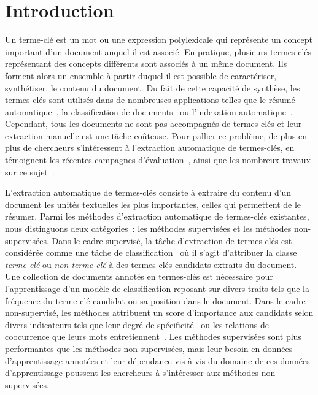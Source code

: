 \section{Introduction}
\label{sec:introduction}
  Un terme-clé est un mot ou une expression polylexicale qui représente un
  concept important d'un document auquel il est associé. En pratique, plusieurs
  termes-clés représentant des concepts différents sont associés à un même
  document. Ils forment alors un ensemble à partir duquel il est possible de
  caractériser, synthétiser, le contenu du document. Du fait de cette capacité
  de synthèse, les termes-clés sont utilisés dans de nombreuses applications
  telles que le résumé automatique~\cite{avanzo2005keyphrase}, la classification
  de documents~\cite{han2007webdocumentclustering} ou l'indexation
  automatique~\cite{medelyan2008smalltrainingset}. Cependant, tous les documents
  ne sont pas accompagnés de termes-clés et leur extraction manuelle est une
  tâche coûteuse. Pour pallier ce problème, de plus en plus de chercheurs
  s'intéressent à l'extraction automatique de termes-clés, en témoignent les
  récentes campagnes d'évaluation~\cite{paroubek2012deft,kim2010semeval}, ainsi
  que les nombreux travaux sur ce sujet~\cite{hasan2014state_of_the_art}.

  L'extraction automatique de termes-clés consiste à extraire du contenu d'un
  document les unités textuelles les plus importantes, celles qui permettent de
  le résumer. Parmi les méthodes d'extraction automatique de termes-clés
  existantes, nous distinguons deux catégories~: les méthodes supervisées et les
  méthodes non-supervisées. Dans le cadre supervisé, la tâche d'extraction de
  termes-clés est considérée comme une tâche de
  classification~\cite{witten1999kea} où il s'agit d'attribuer la classe
  \og{}\textit{terme-clé}\fg{} ou \og{}\textit{non terme-clé}\fg{} à des
  termes-clés candidats extraits du document. Une collection de documents
  annotés en termes-clés est nécessaire pour l'apprentissage d'un modèle de
  classification reposant sur divers traits tels que la fréquence du terme-clé
  candidat ou sa position dans le document. Dans le cadre non-supervisé, les
  méthodes attribuent un score d'importance aux candidats selon divers
  indicateurs tels que leur degré de spécificité~\cite{paukkeri2010likey} ou les
  relations de coocurrence que leurs mots
  entretiennent~\cite{mihalcea2004textrank}. Les méthodes supervisées sont plus
  performantes que les méthodes non-supervisées, mais leur besoin en données
  d'apprentissage annotées et leur dépendance vis-à-vis du domaine de ces
  données d'apprentissage poussent les chercheurs à s'intéresser aux méthodes
  non-supervisées.

